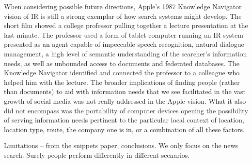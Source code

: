 When considering possible future directions, Apple’s 1987 Knowledge Navigator vision of IR is still a strong exemplar of how search systems might develop. The short film showed a college professor pulling together a lecture presentation at the last minute. The professor used a form of tablet computer running an IR system presented as an agent capable of impeccable speech recognition, natural dialogue management, a high level of semantic understanding of the searcher’s information needs, as well as unbounded access to documents and federated databases.
The Knowledge Navigator identified and connected the professor to a colleague who helped him with the lecture. The broader implications of finding people (rather than documents) to aid with information needs that we see facilitated in the vast growth of social media was not really addressed in the Apple vision. What it also did not encompass was the portability of computer devices opening the possibility of serving information needs pertinent to the particular local context of location, location type, route, the company one is in, or a combination of all these factors. 



Limitations -- from the snippets paper, conclusions. We only focus on the news search. Surely people perform differently in different scenarios.